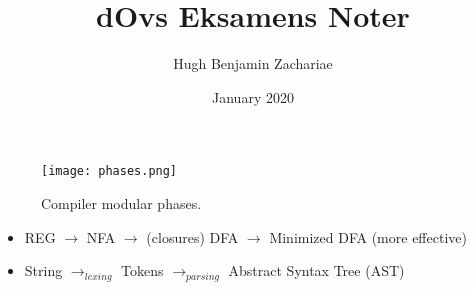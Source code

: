 \documentclass{article}
\title{dOvs Eksamens Noter}
\author{Hugh Benjamin Zachariae}
\date{January 2020}
\begin{document}
\maketitle

\begin{figure}[h]
    \centering
    \texttt{[image: phases.png]}
    \caption{Compiler modular phases.}
    \label{fig:phase}
\end{figure}

\begin{itemize}
    \item REG $\rightarrow$ NFA $\rightarrow$ (closures) DFA $\rightarrow$ Minimized DFA (more effective)
    \item String $\rightarrow_{lexing}$ Tokens $\rightarrow_{parsing}$ Abstract Syntax Tree (AST)
\end{itemize}
\end{document}
